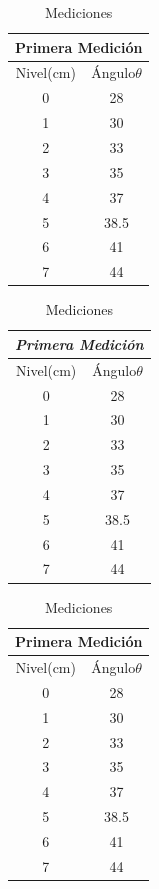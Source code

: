 \documentclass{article}
\begin{document}
\begin{table}[h]
	\centering
	\begin{tabular}{|c|c|}
		\hline
		\multicolumn{2}{|c|}{\textbf{Primera Medición}}
		\\\hline
		Nivel(cm)&Ángulo$\theta$\\\hline
		0&28\\\hline
		1&30\\\hline
		2&33\\\hline
		3&35\\\hline
		4&37\\\hline
		5&38.5\\\hline
		6&41\\\hline
		7&44\\\hline
	\end{tabular}
	\hspace{1cm}
	\begin{tabular}{|c|c|}
		\hline
		\multicolumn{2}{|c|}{\textit{Primera Medición}}
		\\\hline
		Nivel(cm)&Ángulo$\theta$\\\hline
		0&28\\\hline
		1&30\\\hline
		2&33\\\hline
		3&35\\\hline
		4&37\\\hline
		5&38.5\\\hline
		6&41\\\hline
		7&44\\\hline
	\end{tabular}
\hspace{1cm}
\begin{tabular}{|c|c|}
	\hline
	\multicolumn{2}{|c|}{Primera Medición}
	\\\hline
	Nivel(cm)&Ángulo$\theta$\\\hline
	0&28\\\hline
	1&30\\\hline
	2&33\\\hline
	3&35\\\hline
	4&37\\\hline
	5&38.5\\\hline
	6&41\\\hline
	7&44\\\hline
\end{tabular}
	\caption{Mediciones}
\end{table}
\end{document}
